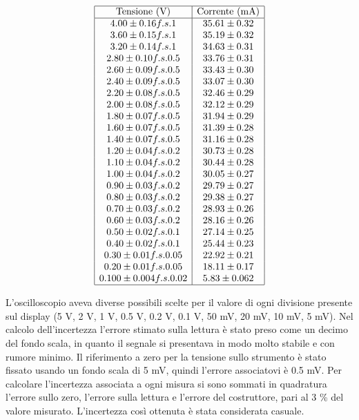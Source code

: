 \documentclass[a4paper,11pt]{article}
\begin{document}
    \begin{minipage}{0.4\textwidth}
        \[
\begin{array}{|c|c|}
\hline
\text{Tensione (V)} & \text{Corrente (mA)} \\ \hline
4.00 \pm 0.16 f.s. 1 & 35.61 \pm 0.32 \\ 
3.60 \pm 0.15 f.s. 1 & 35.19 \pm 0.32 \\ 
3.20 \pm 0.14 f.s. 1 & 34.63 \pm 0.31 \\ 
2.80 \pm 0.10 f.s. 0.5 & 33.76 \pm 0.31 \\ 
2.60 \pm 0.09 f.s. 0.5 & 33.43 \pm 0.30 \\ 
2.40 \pm 0.09 f.s. 0.5 & 33.07 \pm 0.30 \\ 
2.20 \pm 0.08 f.s. 0.5 & 32.46 \pm 0.29 \\ 
2.00 \pm 0.08 f.s. 0.5 & 32.12 \pm 0.29 \\ 
1.80 \pm 0.07 f.s. 0.5 & 31.94 \pm 0.29 \\ 
1.60 \pm 0.07 f.s. 0.5 & 31.39 \pm 0.28 \\ 
1.40 \pm 0.07 f.s. 0.5 & 31.16 \pm 0.28 \\ 
1.20 \pm 0.04 f.s. 0.2 & 30.73 \pm 0.28 \\ 
1.10 \pm 0.04 f.s. 0.2 & 30.44 \pm 0.28 \\ 
1.00 \pm 0.04 f.s. 0.2 & 30.05 \pm 0.27 \\ 
0.90 \pm 0.03 f.s. 0.2 & 29.79 \pm 0.27 \\ 
0.80 \pm 0.03 f.s. 0.2 & 29.38 \pm 0.27 \\ 
0.70 \pm 0.03 f.s. 0.2 & 28.93 \pm 0.26 \\ 
0.60 \pm 0.03 f.s. 0.2 & 28.16 \pm 0.26 \\ 
0.50 \pm 0.02 f.s. 0.1 & 27.14 \pm 0.25 \\ 
0.40 \pm 0.02 f.s. 0.1 & 25.44 \pm 0.23 \\ 
0.30 \pm 0.01 f.s. 0.05 & 22.92 \pm 0.21 \\ 
0.20 \pm 0.01 f.s. 0.05 & 18.11 \pm 0.17 \\ 
0.100 \pm 0.004 f.s. 0.02 & 5.83 \pm 0.062 \\ \hline

\end{array}\label{tab::dati_200}
\]    
    \end{minipage}


L'oscilloscopio aveva diverse possibili scelte per il valore di ogni divisione presente sul display (5 V, 2 V, 1 V, 0.5 V, 0.2 V, 0.1 V, 50 mV, 20 mV, 10 mV, 5 mV). Nel calcolo dell'incertezza l'errore stimato sulla lettura è stato preso come un decimo del fondo scala, in quanto il segnale si presentava in modo molto stabile e con rumore minimo. Il riferimento a zero per la tensione sullo strumento è stato fissato usando un fondo scala di 5 mV, quindi l'errore associatovi è 0.5 mV. Per calcolare l'incertezza associata a ogni misura si sono sommati in quadratura l'errore sullo zero, l'errore sulla lettura e l'errore del costruttore, pari al 3 \% del valore misurato. L'incertezza così ottenuta è stata considerata casuale.
 
\end{document}
